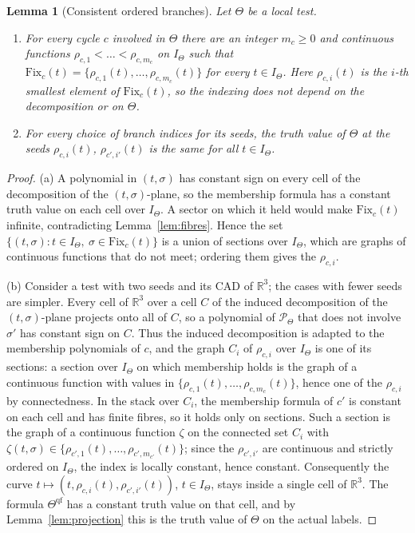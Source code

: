 \documentclass[11pt,a4paper]{article}
\theoremstyle{plain}
\newtheorem{lemma}[theorem]{Lemma}
\theoremstyle{definition}
\theoremstyle{remark}
\newcommand{\R}{\mathbb{R}}
\begin{document}
\begin{lemma}[Consistent ordered branches]\label{lem:branches}
Let $\Theta$ be a local test.
\begin{enumerate}[label=(\alph*)]
\item For every cycle $c$ involved in $\Theta$ there are an integer $m_c\ge0$ and continuous functions $\rho_{c,1}<\dots<\rho_{c,m_c}$ on $I_\Theta$ such that $\mathrm{Fix}_c(t)=\{\rho_{c,1}(t),\dots,\rho_{c,m_c}(t)\}$ for every $t\in I_\Theta$. Here $\rho_{c,i}(t)$ is the $i$-th smallest element of $\mathrm{Fix}_c(t)$, so the indexing does not depend on the decomposition or on $\Theta$.
\item For every choice of branch indices for its seeds, the truth value of $\Theta$ at the seeds $\rho_{c,i}(t)$, $\rho_{c',i'}(t)$ is the same for all $t\in I_\Theta$.
\end{enumerate}
\end{lemma}
\begin{proof}
(a) A polynomial in $(t,\sigma)$ has constant sign on every cell of the decomposition of the $(t,\sigma)$-plane, so the membership formula has a constant truth value on each cell over $I_\Theta$. A sector on which it held would make $\mathrm{Fix}_c(t)$ infinite, contradicting Lemma~\ref{lem:fibres}. Hence the set $\{(t,\sigma):t\in I_\Theta,\ \sigma\in\mathrm{Fix}_c(t)\}$ is a union of sections over $I_\Theta$, which are graphs of continuous functions that do not meet; ordering them gives the $\rho_{c,i}$.

(b) Consider a test with two seeds and its CAD of $\R^3$; the cases with fewer seeds are simpler. Every cell of $\R^3$ over a cell $C$ of the induced decomposition of the $(t,\sigma)$-plane projects onto all of $C$, so a polynomial of $\mathcal{P}_\Theta$ that does not involve $\sigma'$ has constant sign on $C$. Thus the induced decomposition is adapted to the membership polynomials of $c$, and the graph $C_i$ of $\rho_{c,i}$ over $I_\Theta$ is one of its sections: a section over $I_\Theta$ on which membership holds is the graph of a continuous function with values in $\{\rho_{c,1}(t),\dots,\rho_{c,m_c}(t)\}$, hence one of the $\rho_{c,i}$ by connectedness. In the stack over $C_i$, the membership formula of $c'$ is constant on each cell and has finite fibres, so it holds only on sections. Such a section is the graph of a continuous function $\zeta$ on the connected set $C_i$ with $\zeta(t,\sigma)\in\{\rho_{c',1}(t),\dots,\rho_{c',m_{c'}}(t)\}$; since the $\rho_{c',i'}$ are continuous and strictly ordered on $I_\Theta$, the index is locally constant, hence constant. Consequently the curve $t\mapsto(t,\rho_{c,i}(t),\rho_{c',i'}(t))$, $t\in I_\Theta$, stays inside a single cell of $\R^3$. The formula $\Theta^{\mathrm{qf}}$ has a constant truth value on that cell, and by Lemma~\ref{lem:projection} this is the truth value of $\Theta$ on the actual labels.
\end{proof}
\end{document}
